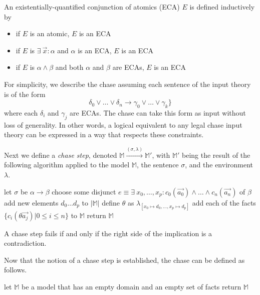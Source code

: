 		An existentially-quantified conjunction of atomics (ECA) $E$ is defined
		inductively by
		\begin{itemize}
		\item if $E$ is an atomic, $E$ is an ECA
		\item if $E$ is $\exists\ \vec{x} : \alpha$ and $\alpha$ is an ECA, $E$ is an ECA
		\item if $E$ is $\alpha \wedge \beta$ and both $\alpha$ and $\beta$ are ECAs, $E$ is an ECA
		\end{itemize}
		For simplicity, we describe the chase assuming each sentence of the
		input theory is of the form
		\[\delta_0 \vee\ldots\vee \delta_n \to \gamma_0 \vee\ldots\vee \gamma_k\}\]
		where each $\delta_i$ and $\gamma_j$ are ECAs. The chase can take this
		form as input without loss of generality. In other words, a logical
		equivalent to any legal chase input theory can be expressed in a way
		that respects these constraints.

		Next we define a \emph{chase step}, denoted $\mathbb{M}
		\xrightarrow{(\sigma,\lambda)} \mathbb{M}'$, with $\mathbb{M'}$ being
		the result of the following algorithm applied to the model
		$\mathbb{M}$, the sentence $\sigma$, and the environment $\lambda$.

		\begin{algorithm}[H]
		\DontPrintSemicolon
		let $\sigma$ be $\alpha \to \beta$ \;
		choose some disjunct $e \equiv \exists\ x_0,\ldots,x_p : c_0(\vec{a_0}) \wedge\ldots\wedge c_n(\vec{a_n})$ of $\beta$ \;
		add new elements $d_0 \ldots d_p$ to $|\mathbb{M}|$ \;
		define $\theta$ as $\lambda_{[x_0 \mapsto d_0 , \ldots , x_p \mapsto d_p]}$ \;
		add each of the facts $\{c_i(\theta\vec{a_j}) | 0 \le i \le n \}$ to $\mathbb{M}$ \;
		return $\mathbb{M}$ \;
		\end{algorithm}

		A chase step fails if and only if the right side of the
		implication is a contradiction.

		Now that the notion of a chase step is established, the chase can be
		defined as follows.

		\begin{algorithm}[H]
		\DontPrintSemicolon
		let $\mathbb{M}$ be a model that has an empty domain and an empty set of facts \;
		return $\mathbb{M}$
		\end{algorithm}

